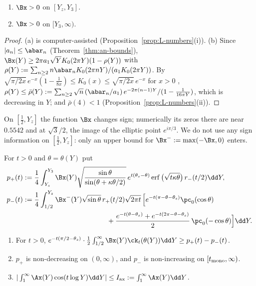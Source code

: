 \begin{lemma}[Signs of $\Bx$]\label{lem:B-sign}
\begin{enumerate}[label=\textup{(\alph*)}]
\item $\Bx>0$ on $[Y_z,Y_3]$.
\item $\Bx>0$ on $[Y_3,\infty)$.
\end{enumerate}
\end{lemma}

\begin{proof}
(a) is computer-assisted (Proposition~\ref{prop:L-numbers}(i)). (b) Since $|a_n|\le\abar_n$ (Theorem~\ref{thm:an-bounds}),
$\Bx(Y)\ge2\pi a_1\sqrt YK_0(2\pi Y)(1-\rho(Y))$ with $\rho(Y):=\sum_{n\ge2}n\abar_nK_0(2\pi nY)/(a_1K_0(2\pi Y))$. By
$\sqrt{\pi/2x}\,e^{-x}(1-\frac1{8x})\le K_0(x)\le\sqrt{\pi/2x}\,e^{-x}$ for $x>0$ \cite[\S10.40(ii)]{DLMF},
$\rho(Y)\le\bar\rho(Y):=\sum_{n\ge2}\sqrt n\,(\abar_n/a_1)\,e^{-2\pi(n-1)Y}/(1-\frac1{16\pi Y})$, which is decreasing in $Y$; and $\bar\rho(4)<1$
(Proposition~\ref{prop:L-numbers}(ii)).
\end{proof}

On $[\frac12,Y_z]$ the function $\Bx$ changes sign; numerically its zeros there are near $0.5542$ and at $\sqrt3/2$, the image of the elliptic point
$e^{i\pi/3}$. We do not use any sign information on $[\frac12,Y_z]$: only an upper bound for $\Bx^-:=\max(-\Bx,0)$ enters.

For $t>0$ and $\theta=\theta(Y)$ put
\begin{align*}
p_+(t)&:=\frac14\int_{Y_s}^{Y_3}\Bx(Y)\sqrt{\frac{\sin\theta}{\sin(\theta+\kappa\theta/2)}}\,e^{t(\theta_s-\theta)}\operatorname{erf}\big(\sqrt{t\kappa\theta}\big)\,r_-(t/2)\dd Y,\\
p_-(t)&:=\frac14\int_{1/2}^{Y_z}\Bx^-(Y)\sqrt{\sin\theta}\,r_+(t/2)\sqrt{2\pi t}\,\Big[e^{-t(\pi-\theta-\theta_s)}\pc_0(\cos\theta)\\
&\hspace{12em}+\frac{e^{-t(\theta-\theta_s)}+e^{-t(2\pi-\theta-\theta_s)}}2\,\pc_0(-\cos\theta)\Big]\dd Y .
\end{align*}

\begin{lemma}\label{lem:comparison}
\begin{enumerate}[label=\textup{(\alph*)}]
\item For $t>0$, $e^{-t(\pi/2-\theta_s)}\cdot\frac12\int_{1/2}^\infty\Bx(Y)\ck_t(\theta(Y))\dd Y\ge p_+(t)-p_-(t)$.
\item $p_+$ is non-decreasing on $(0,\infty)$, and $p_-$ is non-increasing on $[t_{\rm mono},\infty)$.
\item $|\int_1^\infty\Ax(Y)\cos(t\log Y)\dd Y|\le I_{\rm ax}:=\int_1^\infty\Ax(Y)\dd Y$.
\end{enumerate}
\end{lemma}

